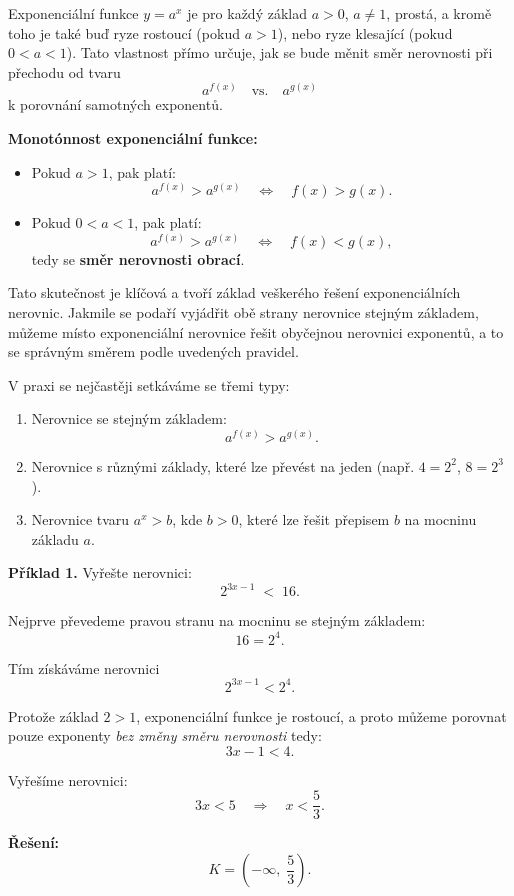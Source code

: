 \documentclass[12pt,a4paper]{article}
\begin{document}
\medskip

Exponenciální funkce $y = a^x$ je pro každý základ $a>0$, $a\neq1$, prostá, a kromě toho je také
buď ryze rostoucí (pokud $a>1$), nebo ryze klesající (pokud $0<a<1$). Tato vlastnost přímo určuje,
jak se bude měnit směr nerovnosti při přechodu od tvaru
\[
a^{f(x)} \quad \text{vs.} \quad a^{g(x)}
\]
k porovnání samotných exponentů.

\begin{notebox}
\textbf{Monotónnost exponenciální funkce:}

\begin{itemize}
    \item Pokud $a > 1$, pak platí:  
    \[
        a^{f(x)} > a^{g(x)} \quad\Longleftrightarrow\quad f(x) > g(x).
    \]

    \item Pokud $0 < a < 1$, pak platí:  
    \[
        a^{f(x)} > a^{g(x)} \quad\Longleftrightarrow\quad f(x) < g(x),
    \]
    tedy se \textbf{směr nerovnosti obrací}.
\end{itemize}

\end{notebox}

Tato skutečnost je klíčová a tvoří základ veškerého řešení exponenciálních nerovnic.
Jakmile se podaří vyjádřit obě strany nerovnice stejným základem, můžeme místo exponenciální
nerovnice řešit obyčejnou nerovnici exponentů, a to se správným směrem podle uvedených pravidel.

\medskip

V praxi se nejčastěji setkáváme se třemi typy:

\begin{enumerate}[label=\arabic*.]
    \item Nerovnice se stejným základem:  
          \[
              a^{f(x)} > a^{g(x)}.
          \]

    \item Nerovnice s různými základy, které lze převést na jeden (např. $4 = 2^2$, $8 = 2^3$).

    \item Nerovnice tvaru $a^x > b$, kde $b>0$, které lze řešit přepisem $b$ na mocninu základu $a$.
\end{enumerate}

\begin{examplebox}
\textbf{Příklad 1.}  
Vyřešte nerovnici:
\[
    2^{3x-1} \; < \; 16.
\]

Nejprve převedeme pravou stranu na mocninu se stejným základem:
\[
16 = 2^4.
\]

Tím získáváme nerovnici
\[
    2^{3x-1} < 2^4.
\]

Protože základ $2>1$, exponenciální funkce je rostoucí, a proto můžeme porovnat
pouze exponenty \textit{bez změny směru nerovnosti} tedy:
\[
    3x - 1 < 4.
\]

Vyřešíme nerovnici:
\[
3x < 5 \quad\Longrightarrow\quad x < \frac{5}{3}.
\]

\medskip
\textbf{Řešení:}  
\[
K = \left(-\infty,\; \frac{5}{3}\right).
\]
\end{examplebox}
\end{document}
